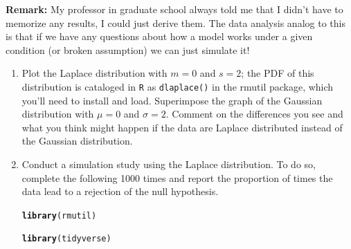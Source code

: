 \documentclass{article}\usepackage[]{graphicx}\usepackage[]{color}
\makeatletter
\newcommand{\hlstd}[1]{\textcolor[rgb]{0.345,0.345,0.345}{#1}}%
\newcommand{\hlkwd}[1]{\textcolor[rgb]{0.737,0.353,0.396}{\textbf{#1}}}%
\newenvironment{kframe}{%
 \def\at@end@of@kframe{}%
 \ifinner\ifhmode%
  \def\at@end@of@kframe{\end{minipage}}%
  \begin{minipage}{\columnwidth}%
 \fi\fi%
 \def\FrameCommand##1{\hskip\@totalleftmargin \hskip-\fboxsep
 \colorbox{shadecolor}{##1}\hskip-\fboxsep
     \hskip-\linewidth \hskip-\@totalleftmargin \hskip\columnwidth}%
 \MakeFramed {\advance\hsize-\width
   \@totalleftmargin\z@ \linewidth\hsize
   \@setminipage}}%
 {\par\unskip\endMakeFramed%
 \at@end@of@kframe}
\newenvironment{knitrout}{}{} %
\makeatother
\begin{document}
\begin{enumerate}
\textbf{Remark:} My professor in graduate school always told me that I didn't
have to memorize any results, I could just derive them. The data analysis
analog to this is that if we have any questions about how a model works
under a given condition (or broken assumption) we can just simulate it!
\begin{enumerate}
  \item Plot the Laplace distribution with $m=0$ and $s=2$; the PDF
  of this distribution is cataloged in \texttt{R} as \texttt{dlaplace()} 
  in the rmutil package, which you'll need to install and load. Superimpose
  the graph of the Gaussian distribution with $\mu=0$ and $\sigma=2$. Comment
  on the differences you see and what you think might happen if the data 
  are Laplace distributed instead of the Gaussian distribution.
  \item Conduct a simulation study using the Laplace distribution. To do so, 
  complete the following 1000 times and report the proportion of times the
  data lead to a rejection of the null hypothesis.\\
\begin{knitrout}
\color{fgcolor}\begin{kframe}
\begin{alltt}
\hlkwd{library}\hlstd{(rmutil)}
\end{alltt}


{\ttfamily\noindent\itshape\color{messagecolor}{\#\# \\\#\# Attaching package: 'rmutil'}}

{\ttfamily\noindent\itshape\color{messagecolor}{\#\# The following object is masked from 'package:stats':\\\#\# \\\#\# \ \ \ \ nobs}}

{\ttfamily\noindent\itshape\color{messagecolor}{\#\# The following objects are masked from 'package:base':\\\#\# \\\#\# \ \ \ \ as.data.frame, units}}\begin{alltt}
\hlkwd{library}\hlstd{(tidyverse)}
\end{alltt}


{\ttfamily\noindent\itshape\color{messagecolor}{\#\# Registered S3 method overwritten by 'httr':\\\#\# \ \ method \ \ \ \ \ \ \ \ from \ \\\#\# \ \ print.response rmutil}}


\end{kframe}
\end{knitrout}
\end{enumerate}
\end{enumerate}
\end{document}
